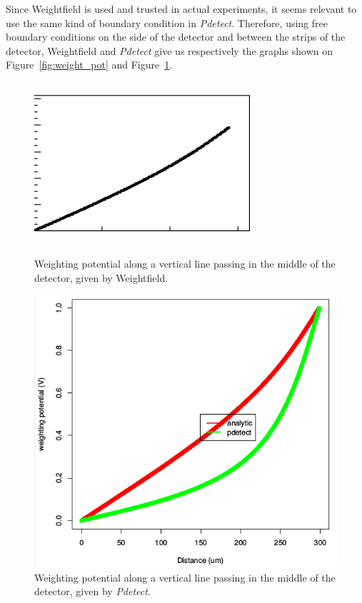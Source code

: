 \documentclass[11pt]{article}
\begin{document}
			Since Weightfield is used and trusted in actual experiments, it seems relevant to use the same kind
			of boundary condition in \textit{Pdetect}. Therefore, using free boundary conditions on the side of
			the detector and between the strips of the detector, Weightfield and \textit{Pdetect} give us respectively
			the graphs shown on Figure~\ref{fig:weight_pot} and Figure~\ref{fig:free_conditions}.

			\begin{figure}[H]
				\begin{minipage}[b]{.46\linewidth}
					\center
					\includegraphics[height=6cm, width=8cm]{images/boundary_conditions/weight_pot.png}
					\caption{Weighting potential along a vertical line passing in the middle of the detector,
							given by Weightfield.}
					\label{fig:weight_pot}
				\end{minipage} \hfill
				\begin{minipage}[b]{.46\linewidth}
				\center
					\includegraphics[scale=0.4]{images/boundary_conditions/free_conditions.png}
					\caption{Weighting potential along a vertical line passing in the middle of the detector,
							given by \textit{Pdetect}.}
					\label{fig:free_conditions}
					\end{minipage}
			\end{figure}
\end{document}
